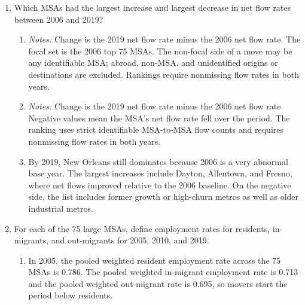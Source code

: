 \documentclass{article}
\newcommand{\tabnote}[1]{%
\par\vspace{0.25em}
\begin{minipage}{0.92\textwidth}
\footnotesize \emph{Notes:} #1
\end{minipage}
}
\begin{document}
\begin{enumerate}[leftmargin=*]
\item Which MSAs had the largest increase and largest decrease in net flow rates between 2006 and 2019?

\begin{enumerate}[label=(\roman*)]
    \item \leavevmode

    \begin{table}[H]
    
    \caption{Top 10 increases in net flow rates, 2006 to 2019.}
    \tabnote{Change is the 2019 net flow rate minus the 2006 net flow rate. The focal set is the 2006 top 75 MSAs. The non-focal side of a move may be any identifiable MSA; abroad, non-MSA, and unidentified origins or destinations are excluded. Rankings require nonmissing flow rates in both years.}
    \end{table}

    \item \leavevmode

    \begin{table}[H]
    
    \caption{Top 10 decreases in net flow rates, 2006 to 2019.}
    \tabnote{Change is the 2019 net flow rate minus the 2006 net flow rate. Negative values mean the MSA's net flow rate fell over the period. The ranking uses strict identifiable MSA-to-MSA flow counts and requires nonmissing flow rates in both years.}
    \end{table}

    \item 

    By 2019, New Orleans still dominates because 2006 is a very abnormal base year. The largest increases include Dayton, Allentown, and Fresno, where net flows improved relative to the 2006 baseline. On the negative side, the list includes former growth or high-churn metros as well as older industrial metros.
\end{enumerate}

\item For each of the 75 large MSAs, define employment rates for residents, in-migrants, and out-migrants for 2005, 2010, and 2019.

\begin{enumerate}[label=(\roman*)]
    \item 

    In 2005, the pooled weighted resident employment rate across the 75 MSAs is 0.786. The pooled weighted in-migrant employment rate is 0.713 and the pooled weighted out-migrant rate is 0.695, so movers start the period below residents.


\end{enumerate}
\end{enumerate}
\end{document}
